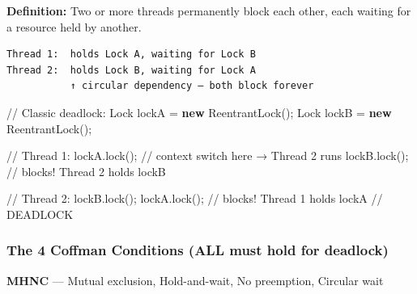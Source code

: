 \documentclass[11pt]{article}
\newenvironment{Shaded}{\begin{snugshade}}{\end{snugshade}}
\newcommand{\BuiltInTok}[1]{\textcolor[rgb]{0.50,0.55,0.55}{#1}}
\newcommand{\CommentTok}[1]{\textcolor[rgb]{0.48,0.49,0.49}{#1}}
\newcommand{\FunctionTok}[1]{\textcolor[rgb]{0.56,0.27,0.68}{#1}}
\newcommand{\KeywordTok}[1]{\textcolor[rgb]{0.81,0.81,0.76}{\textbf{#1}}}
\newcommand{\NormalTok}[1]{\textcolor[rgb]{0.81,0.81,0.76}{#1}}
\newcommand{\OperatorTok}[1]{\textcolor[rgb]{0.81,0.81,0.76}{#1}}
\begin{document}

\textbf{Definition:} Two or more threads permanently block each other, each waiting for a resource held by another.

\setcodelang{}

\begin{verbatim}
Thread 1:  holds Lock A, waiting for Lock B
Thread 2:  holds Lock B, waiting for Lock A
           ↑ circular dependency — both block forever
\end{verbatim}


\begin{Shaded}
\begin{Highlighting}[]
\CommentTok{// Classic deadlock:}
\BuiltInTok{Lock}\NormalTok{ lockA }\OperatorTok{=} \KeywordTok{new} \BuiltInTok{ReentrantLock}\OperatorTok{();}
\BuiltInTok{Lock}\NormalTok{ lockB }\OperatorTok{=} \KeywordTok{new} \BuiltInTok{ReentrantLock}\OperatorTok{();}

\CommentTok{// Thread 1:}
\NormalTok{lockA}\OperatorTok{.}\FunctionTok{lock}\OperatorTok{();}
\CommentTok{// context switch here → Thread 2 runs}
\NormalTok{lockB}\OperatorTok{.}\FunctionTok{lock}\OperatorTok{();} \CommentTok{// blocks! Thread 2 holds lockB}

\CommentTok{// Thread 2:}
\NormalTok{lockB}\OperatorTok{.}\FunctionTok{lock}\OperatorTok{();}
\NormalTok{lockA}\OperatorTok{.}\FunctionTok{lock}\OperatorTok{();} \CommentTok{// blocks! Thread 1 holds lockA}
\CommentTok{// DEADLOCK}
\end{Highlighting}
\end{Shaded}

\subsubsection{The 4 Coffman Conditions (ALL must hold for deadlock)}\label{the-4-coffman-conditions-all-must-hold-for-deadlock}

\textbf{MHNC} --- Mutual exclusion, Hold-and-wait, No preemption, Circular wait
\end{document}
